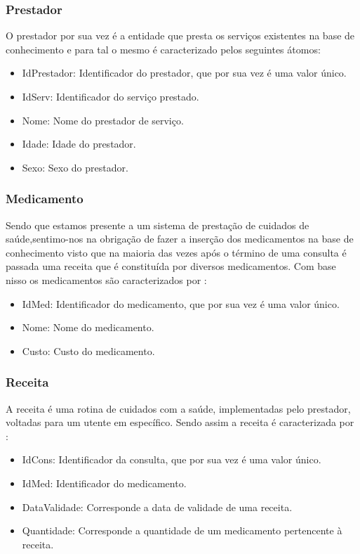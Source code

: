 \documentclass[25pt]{article}
\begin{document}
\subsubsection{Prestador}
O prestador por sua vez é a entidade que presta os serviços existentes na base de conhecimento e para tal o mesmo é caracterizado pelos seguintes
átomos:

\begin{itemize}
  \item IdPrestador: Identificador do prestador, que por sua vez é uma valor único.
  \item IdServ: Identificador do serviço prestado.
  \item Nome:   Nome do prestador de serviço.
  \item Idade:  Idade do prestador.
  \item Sexo:   Sexo do prestador.
 \end{itemize}


\subsubsection{Medicamento}
Sendo que estamos presente a um sistema de prestação de cuidados de saúde,sentimo-nos na obrigação de fazer a inserção dos medicamentos na base
de conhecimento visto que na maioria das vezes após o término de uma consulta é passada uma receita que é constituída por diversos medicamentos.
Com base nisso os medicamentos são caracterizados por :

\begin{itemize}
  \item IdMed: Identificador do medicamento, que por sua vez é uma valor único.
  \item Nome: Nome do medicamento.
  \item Custo:  Custo do medicamento.
 \end{itemize}



\subsubsection{Receita}
A receita é uma rotina de cuidados com a saúde, implementadas pelo prestador, voltadas para um utente em específico. Sendo assim a receita é caracterizada por :

\begin{itemize}
  \item IdCons: Identificador da consulta, que por sua vez é uma valor único.
  \item IdMed: Identificador do medicamento.
  \item DataValidade:  Corresponde a data de validade de uma receita.
  \item Quantidade: Corresponde a quantidade de um medicamento pertencente à receita.
 \end{itemize}
\end{document}
